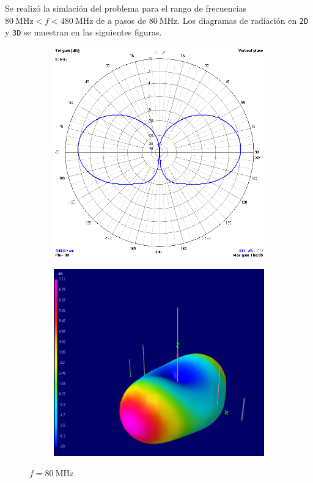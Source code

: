 Se realizó la simlación del problema para el rango de frecuencias $\SI{80}{\mega\hertz} < f < \SI{480}{\mega\hertz}$ de a pasos de $\SI{80}{\mega\hertz}$. Los diagramas de radiación en \texttt{2D} y \texttt{3D} se muestran en las siguientes figuras.

\begin{figure}[H]
	\begin{subfigure}{0.5\textwidth}
		\includegraphics[scale=0.43]{imagenes/2D_80MHz.png}
	\end{subfigure}	
	\quad
	\begin{subfigure}{0.5\textwidth}
		\includegraphics[scale=0.43]{imagenes/3D_80MHz.png}
	\end{subfigure}
	\caption{$f=\SI{80}{\mega\hertz}$}
	\label{fig.radiacion_80M}
\end{figure}


